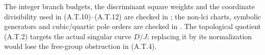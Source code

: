 The integer branch budgets, the discriminant square
weights and the coordinate divisibility used in
(A.T.10)--(A.T.12) are checked in
; the non-lci charts,
symbolic generators and cubic/quartic pole orders
are checked in .
The topological
quotient (A.T.2) targets the actual singular curve
$D/J$; replacing it by its normalization would
lose the free-group obstruction in (A.T.4).
